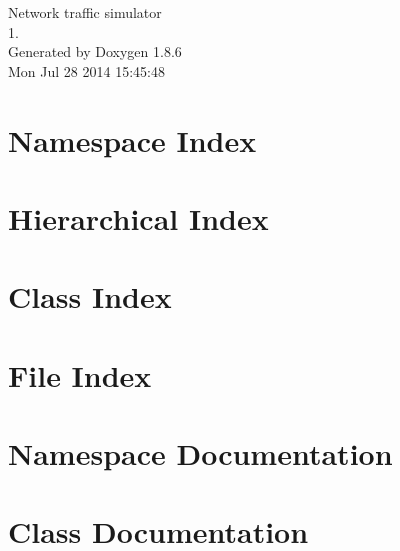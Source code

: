 \documentclass[twoside]{book}
\newcommand{\clearemptydoublepage}{%
  \newpage{\pagestyle{empty}\cleardoublepage}%
}
\begin{document}
\hypersetup{pageanchor=false}
\begin{titlepage}
\vspace*{7cm}
\begin{center}%
{\Large Network traffic simulator \\[1ex]\large 1. }\\
\vspace*{1cm}
{\large Generated by Doxygen 1.8.6}\\
\vspace*{0.5cm}
{\small Mon Jul 28 2014 15:45:48}\\
\end{center}
\end{titlepage}
\clearemptydoublepage
\tableofcontents
\clearemptydoublepage
{}
\hypersetup{pageanchor=true}

\chapter{Namespace Index}

\chapter{Hierarchical Index}

\chapter{Class Index}

\chapter{File Index}

\chapter{Namespace Documentation}



\chapter{Class Documentation}






















\end{document}
